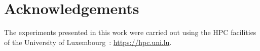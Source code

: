 \section*{Acknowledgements}



The experiments presented in this work were carried out using the HPC facilities of
the University of Luxembourg~\cite{Varrette22}: \url{https://hpc.uni.lu}.


